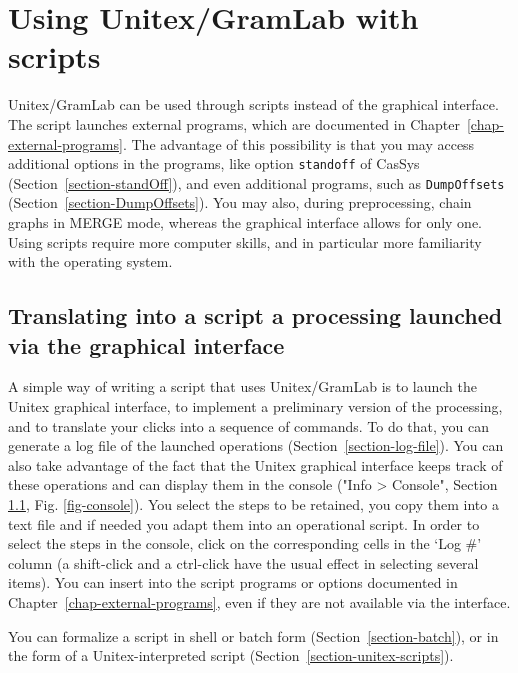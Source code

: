 \chapter{Using Unitex/GramLab with scripts}
\label{chap-scripts}

Unitex/GramLab can be used through scripts instead of the graphical interface.
The script launches external programs, which are documented in
Chapter~\ref{chap-external-programs}. The advantage of this possibility is that you may
access additional options in the programs, like option \verb$standoff$ of CasSys
(Section~\ref{section-standOff}), and even additional programs, such as
\verb$DumpOffsets$ (Section~\ref{section-DumpOffsets}). You may also, during preprocessing,
chain graphs in MERGE mode, whereas the graphical interface allows for only one.
Using scripts require more computer skills, and in particular more familiarity with the operating system.



\section{Translating into a script a processing launched via the graphical interface}
\label{section-console}

A simple way of writing a script that uses Unitex/GramLab is to launch the Unitex graphical interface,
to implement a preliminary version of the processing, and to translate your clicks into a sequence
of commands.
To do that, you can generate a log file of the launched operations (Section~\ref{section-log-file}).
You can also take advantage of the fact that the Unitex graphical interface keeps track
of these operations and can display them in the
console ("Info > Console", Section \ref{section-console}, Fig. \ref{fig-console}). You select the steps
to be retained, you copy them into a text file and if needed you adapt them into an operational script.
In order to select the steps in the console, click on the corresponding cells in the `Log \#' column
(a shift-click and a ctrl-click have the usual effect in selecting several items).
You can insert into the script programs or options documented in
Chapter~\ref{chap-external-programs}, even if they are not available via the interface.

\bigskip
\noindent You can formalize a script in shell or batch form (Section~\ref{section-batch}),
or in the form of a Unitex-interpreted script (Section~\ref{section-unitex-scripts}).



